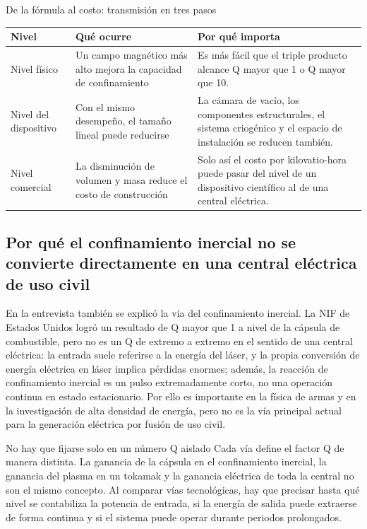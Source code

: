 \begin{knowledgebox}{De la fórmula al costo: transmisión en tres pasos}
\begin{tabularx}{\textwidth}{p{}p{}X}
\toprule
Nivel & Qué ocurre & Por qué importa \\
\midrule
Nivel físico & Un campo magnético más alto mejora la capacidad de confinamiento & Es más fácil que el triple producto alcance Q mayor que 1 o Q mayor que 10. \\
Nivel del dispositivo & Con el mismo desempeño, el tamaño lineal puede reducirse & La cámara de vacío, los componentes estructurales, el sistema criogénico y el espacio de instalación se reducen también. \\
Nivel comercial & La disminución de volumen y masa reduce el costo de construcción & Solo así el costo por kilovatio-hora puede pasar del nivel de un dispositivo científico al de una central eléctrica. \\
\bottomrule
\end{tabularx}
\end{knowledgebox}

\subsection{Por qué el confinamiento inercial no se convierte directamente en una central eléctrica de uso civil}

En la entrevista también se explicó la vía del confinamiento inercial. La NIF de Estados Unidos logró un resultado de Q mayor que 1 a nivel de la cápsula de combustible, pero no es un Q de extremo a extremo en el sentido de una central eléctrica: la entrada suele referirse a la energía del láser, y la propia conversión de energía eléctrica en láser implica pérdidas enormes; además, la reacción de confinamiento inercial es un pulso extremadamente corto, no una operación continua en estado estacionario. Por ello es importante en la física de armas y en la investigación de alta densidad de energía, pero no es la vía principal actual para la generación eléctrica por fusión de uso civil.

\begin{warningbox}{No hay que fijarse solo en un número Q aislado}
Cada vía define el factor Q de manera distinta. La ganancia de la cápsula en el confinamiento inercial, la ganancia del plasma en un tokamak y la ganancia eléctrica de toda la central no son el mismo concepto. Al comparar vías tecnológicas, hay que precisar hasta qué nivel se contabiliza la potencia de entrada, si la energía de salida puede extraerse de forma continua y si el sistema puede operar durante periodos prolongados.
\end{warningbox}

